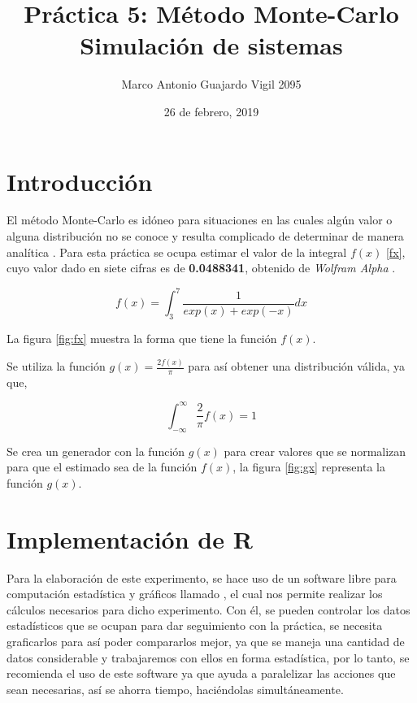 \documentclass{article}
\author{Marco Antonio Guajardo Vigil  2095}
\title{\textbf{Pr\'actica 5: Método Monte-Carlo} \\ Simulaci\'on de sistemas}
\date{26 de febrero, 2019}
\begin{document}
\maketitle

\section{Introducci\'on}
El m\'etodo Monte-Carlo es id\'oneo para situaciones en las cuales alg\'un valor o alguna distribuci\'on no se conoce y resulta complicado de determinar de manera anal\'itica \cite{SatuP5}.
Para esta pr\'actica se ocupa estimar el valor de la integral $f(x)$ \eqref{fx}, cuyo valor dado en siete cifras es de \textbf{0.0488341}, obtenido de \textit{Wolfram Alpha} \cite{WA}.

\begin{equation}
f(x) = \int_{3}^{7}\frac{1}{exp(x) + exp(-x)} dx
\label{fx}
\end{equation}

La figura \ref{fig:fx} muestra la forma que tiene la funci\'on $f(x)$.

Se utiliza la funci\'on $g(x) = \frac{2f(x)}{\pi}$ para as\'i obtener una distribuci\'on v\'alida, ya que,

\begin{equation}
\int_{-\infty}^{\infty}\frac{2}{\pi}f(x) = 1
\end{equation}

Se crea un generador con la funci\'on $g(x)$ para crear valores que se normalizan para que el estimado sea de la funci\'on $f(x)$, la figura \ref{fig:gx} representa la funci\'on $g(x)$.

\section{Implementaci\'on de R}
Para la elaboraci\'on de este experimento, se hace uso de un software libre para computaci\'on estad\'istica y gr\'aficos llamado \citet{R}, el cual nos permite realizar los c\'alculos necesarios para dicho experimento. Con \'el, se pueden controlar los datos estad\'isticos que se ocupan para dar seguimiento con la pr\'actica, se necesita graficarlos para as\'i poder compararlos mejor, ya que se maneja una cantidad de datos considerable y trabajaremos con ellos en forma estad\'istica, por lo tanto, se recomienda el uso de este software ya que ayuda a paralelizar las acciones que sean necesarias, as\'i se ahorra tiempo, haci\'endolas simult\'aneamente.
\end{document}
